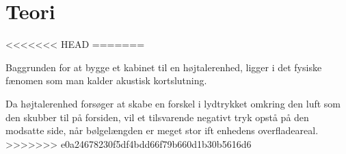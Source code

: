 \chapter{Teori}
<<<<<<< HEAD
=======

Baggrunden for at bygge et kabinet til en højtalerenhed, ligger i det fysiske fænomen som man kalder akustisk kortslutning. 

Da højtalerenhed forsøger at skabe en forskel i lydtrykket omkring den luft som den skubber til på forsiden, vil et tilsvarende negativt tryk opstå på den modsatte side, når bølgelængden er meget stor ift enhedens overfladeareal.  
>>>>>>> e0a24678230f5df4bdd66f79b660d1b30b5616d6



